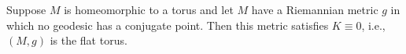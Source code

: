 Suppose $M$ is homeomorphic to a torus and let $M$ have a Riemannian metric $g$ in which no geodesic has a conjugate point. Then this metric satisfies $K \equiv 0$, i.e., $(M, g)$ is the flat torus.
